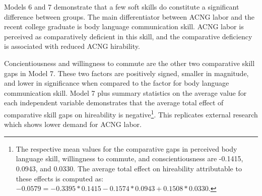 \documentclass[review]{elsarticle}
\begin{document}
Models 6 and 7 demonstrate that a few soft skills do constitute a significant difference between groups.
The main differentiator between ACNG labor and the recent college graduate is body language communication skill.
ACNG labor is perceived as comparatively deficient in this skill,
and the comparative deficiency is associated with reduced ACNG hirability.

Concientiousness and willingness to commute are the other two comparative skill gaps in Model 7.
These two factors are positively signed, smaller in magnitude, and lower in significance when compared to the factor for body language communication skill.
Model 7 plus summary statistics on the average value for each independent variable demonstrates that
the average total effect of comparative skill gaps on hireability is negative\footnote{
    The respective mean values for the comparative gaps in perceived body language skill,
    willingness to commute,
    and conscientiousness
    are -0.1415, 0.0943, and 0.0330.
    The average total effect on hireability attributable to these effects is computed as:
    $-0.0579 = -0.3395*0.1415 - 0.1574*0.0943 + 0.1508*0.0330$.
}.
This replicates external research which shows lower demand for ACNG labor.
\end{document}
